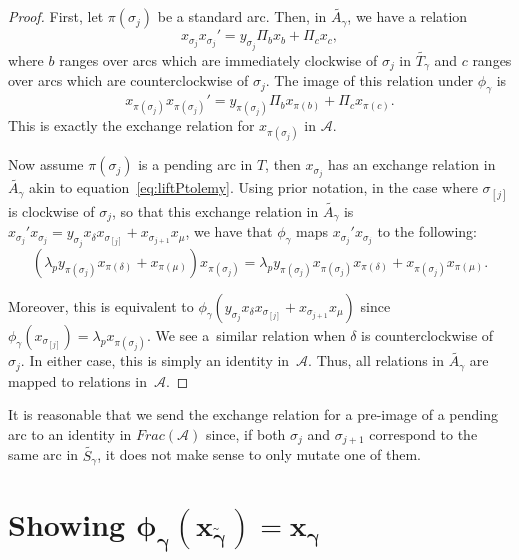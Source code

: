 \documentclass[11pt]{article}
\numberwithin{equation}{section}
\begin{document}
\begin{proof}
First, let $\pi(\sigma_j)$ be a standard arc. Then, in $\widetilde{A_\gamma}$, we have a relation \begin{equation}\label{eq:liftPtolemy}
x_{\sigma_j}x_{\sigma_j}' = y_{\sigma_j} \Pi_b x_b + \Pi_c x_c, \end{equation} where $b$ ranges over arcs which are immediately clockwise of $\sigma_j$ in $\widetilde{T_\gamma}$ and $c$ ranges over arcs which are counterclockwise of $\sigma_j$. The image of this relation under $\phi_\gamma$ is \begin{equation}
x_{\pi(\sigma_j)}x_{\pi(\sigma_j)}' = y_{\pi(\sigma_j)}\Pi_b x_{\pi(b)} + \Pi_c x_{\pi(c)}.\end{equation} This is exactly the exchange relation for $x_{\pi(\sigma_j)}$ in $\mathcal{A}$.

 Now assume $\pi(\sigma_j)$ is a pending arc in $T$, then $x_{\sigma_j}$ has an exchange relation in $\widetilde{A_\gamma}$ akin to equation~\eqref{eq:liftPtolemy}. Using prior notation, in the case where $\sigma_{[j]}$ is clockwise of $\sigma_j$, so that this exchange relation in $\widetilde{A_\gamma}$ is $x_{\sigma_j}' x_{\sigma_j} = y_{\sigma_j} x_\delta x_{\sigma_{[j]}} + x_{\sigma_{j+1}} x_\mu$, we have that $\phi_\gamma$ maps $x_{\sigma_j}' x_{\sigma_j} $ to the following:\[
 ( \lambda_p y_{\pi(\sigma_j)} x_{\pi(\delta)} + x_{\pi(\mu)}) x_{\pi(\sigma_j)}= \lambda_p y_{\pi(\sigma_j)} x_{\pi(\sigma_j)}x_{\pi(\delta)} + x_{\pi(\sigma_j)} x_{\pi(\mu)}.
\]

Moreover, this is equivalent to $\phi_\gamma( y_{\sigma_j} x_\delta x_{\sigma_{[j]}} + x_{\sigma_{j+1}} x_\mu)$ since $\phi_\gamma(x_{\sigma_{[j]}}) = \lambda_p x_{\pi(\sigma_j)}$.
We see a~similar relation when $\delta$ is counterclockwise of~$\sigma_j$. In either case, this is simply an identity in~$\mathcal{A}$. Thus, all relations in $\widetilde{A_\gamma}$ are mapped to relations in~$\mathcal{A}$.
\end{proof}

\begin{Remark} It is reasonable that we send the exchange relation for a pre-image of a pending arc to an identity in $Frac(\mathcal{A})$ since, if both $\sigma_j$ and $\sigma_{j+1}$ correspond to the same arc in $\widetilde{S_\gamma}$, it does not make sense to only mutate one of them.
\end{Remark}

\section[Showing $\phi_\gamma(x_{\widetilde{\gamma}}) = x_\gamma$]{Showing $\boldsymbol{\phi_\gamma(x_{\widetilde{\gamma}}) = x_\gamma}$}\label{sec:mapClusterVar}
\end{document}

